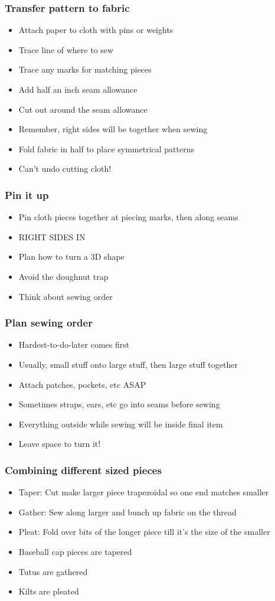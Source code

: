 \documentclass{beamer}
\begin{document}
\begin{frame}[fragile]
\frametitle{Transfer pattern to fabric}
\begin{itemize}
\item Attach paper to cloth with pins or weights
\item Trace line of where to sew
\item Trace any marks for matching pieces
\item Add half an inch seam allowance
\item Cut out around the seam allowance
\item Remember, right sides will be together when sewing
\item Fold fabric in half to place symmetrical patterns
\item Can't undo cutting cloth!
\end{itemize}
\end{frame}

\begin{frame}[fragile]
\frametitle{Pin it up}
\begin{itemize}
\item Pin cloth pieces together at piecing marks, then along seams
\item RIGHT SIDES IN
\item Plan how to turn a 3D shape
\item Avoid the doughnut trap
\item Think about sewing order
\end{itemize}
\end{frame}

\begin{frame}[fragile]
\frametitle{Plan sewing order}
\begin{itemize}
\item Hardest-to-do-later comes first
\item Usually, small stuff onto large stuff, then large stuff together
\item Attach patches, pockets, etc ASAP
\item Sometimes straps, ears, etc go into seams before sewing
\item Everything outside while sewing will be inside final item
\item Leave space to turn it!
\end{itemize}
\end{frame}

\begin{frame}[fragile]
\frametitle{Combining different sized pieces}
\begin{itemize}
\item Taper: Cut make larger piece trapezoidal so one end matches smaller
\item Gather: Sew along larger and bunch up fabric on the thread
\item Pleat: Fold over bits of the longer piece till it's the size of the smaller
\item Baseball cap pieces are tapered
\item Tutus are gathered
\item Kilts are pleated
\end{itemize}
\end{frame}
\end{document}
